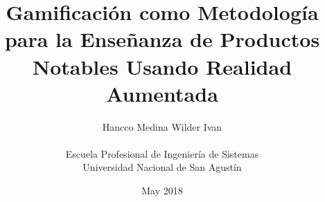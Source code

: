 \documentclass[a4paper, 11pt, oneside]{article}
\begin{document}
\title{Gamificación como Metodología para la Enseñanza de Productos Notables Usando Realidad Aumentada}
\author{Hancco Medina Wilder Ivan\\ \\Escuela Profesional de Ingeniería de Sistemas\\Universidad Nacional de San Agustín }

\date{May 2018}



\maketitle

\renewcommand{\contentsname}{Índice}
\tableofcontents
{}


 
\end{document}
